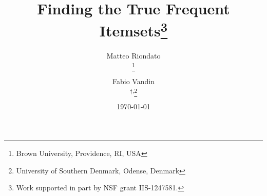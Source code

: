 \documentclass[twoside]{article}
\newif\ifarxiv
\theoremstyle{definition}
\begin{document}
\title{Finding the True Frequent Itemsets\thanks{Work supported in part by NSF
grant IIS-1247581. 
\ifarxiv
 This is an extended version of the work that appeared
as~\citep{RiondatoV14}.
\fi 
}
}
\author{Matteo Riondato
\ifarxiv
\thanks{Department of Computer Science, Brown University, Providence, RI, USA.
\url{matteo@cs.brown.edu} . Contact author.}
\else
\thanks{Brown University, Providence, RI, USA}
\fi 
\and Fabio Vandin
\ifarxiv
\thanks{Department of Computer Science, Brown University, Providence, RI, USA
and Department of Mathematics and Computer Science, University of Southern
Denmark, Odense, Denmark. \url{vandinfa@imada.sdu.dk} .}
\else
\textsuperscript{$\dagger$,}\thanks{University of Southern Denmark, Odense, Denmark}
\fi
}

\date{\today}

\maketitle







%




%
%

\ifarxiv
%


\else
\balance

\fi
 
\end{document}
